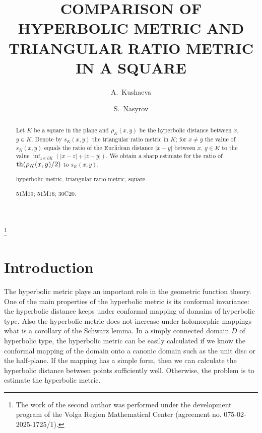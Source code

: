\documentclass[12pt,a4paper]{amsart}
\def\th{\mathop{\rm th}\nolimits}
\begin{document}
\title[]{COMPARISON OF HYPERBOLIC METRIC AND\\ TRIANGULAR RATIO METRIC IN A SQUARE}\thanks{The work of the second author was performed under the development program of the Volga Region
Mathematical Center (agreement no. 075-02-2025-1725/1).}

\author[A.~Kushaeva]{A.~Kushaeva}
\address{Kazan Federal University,
         Kazan, Russia}


\author[S.~Nasyrov]{S.~Nasyrov}
\address{Kazan Federal University,
         Kazan, Russia}

\maketitle

\begin{abstract}
        Let $K$ be a square in the plane and $\rho_K(x,y)$ be the hyperbolic distance between $x$, $y\in K$.
        Denote by $s_K(x,y)$ the triangular ratio metric in $K$; for $x\neq y$ the value of $s_K(x,y)$ equals the ratio of the
        Euclidean distance $|x-y|$ between $x$, $y\in K$ to the value $\inf_{z\in \partial K}(|x-z|+|z-y|)$.
        We obtain a sharp estimate for the ratio of  $\th (\rho_K(x,y)/2)$ to  $s_K(x,y)$.

 {hyperbolic metric, triangular ratio metric, square}.

 51M09; 51M16; 30C20.
\end{abstract}



\section*{Introduction}
The hyperbolic metric plays an important role in the geometric function theory.
One of the main properties of the hyperbolic metric  is its conformal invariance:
the hyperbolic distance keeps under conformal mapping of domains of hyperbolic type.
Also the hyperbolic metric does not increase under holomorphic mappings what is a corollary of the
Schwarz lemma. In a simply connected domain $D$ of hyperbolic type,
the hyperbolic metric can be easily calculated if we know the
conformal mapping of the domain onto a canonic domain such as the
unit disc or the half-plane. If the mapping has a simple form, then
we can  calculate the hyperbolic distance between points
sufficiently well. Otherwise, the problem is to estimate  the
hyperbolic metric.
\end{document}
